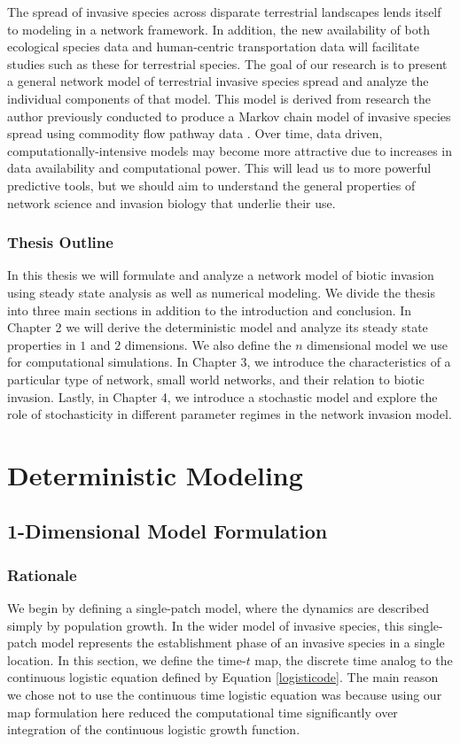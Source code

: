 \documentclass[12pt, openany]{book}
\theoremstyle{definition}
\theoremstyle{remark}
\numberwithin{equation}{chapter}
\numberwithin{figure}{chapter}
\begin{document}
The spread of invasive species across disparate terrestrial landscapes lends itself to modeling in a network framework. In addition, the new availability of both ecological species data and human-centric transportation data will facilitate studies such as these for terrestrial species. The goal of our research is to present a general network model of terrestrial invasive species spread and analyze the individual components of that model. This model is derived from research the author previously conducted to produce a Markov chain model of invasive species spread using commodity flow pathway data \citep{yan2015transport}. Over time, data driven, computationally-intensive models may become more attractive due to increases in data availability and computational power. This will lead us to more powerful predictive tools, but we should aim to understand the general properties of network science and invasion biology that underlie their use.

\subsection{Thesis Outline}

In this thesis we will formulate and analyze a network model of biotic invasion using steady state analysis as well as numerical modeling. We divide the thesis into three main sections in addition to the introduction and conclusion. In Chapter 2 we will derive the deterministic model and analyze its steady state properties in $1$ and $2$ dimensions. We also define the $n$ dimensional model we use for computational simulations. In Chapter 3, we introduce the characteristics of a particular type of network, small world networks, and their relation to biotic invasion. Lastly, in Chapter 4, we introduce a stochastic model and explore the role of stochasticity in different parameter regimes in the network invasion model.

\chapter{Deterministic Modeling}
\section{1-Dimensional Model Formulation}

\subsection{Rationale}
We begin by defining a single-patch model, where the dynamics are described simply by population growth. In the wider model of invasive species, this single-patch model represents the establishment phase of an invasive species in a single location. In this section, we define the time-$t$ map, the discrete time analog to the continuous logistic equation defined by Equation \ref{logisticode}. The main reason we chose not to use the continuous time logistic equation was because using our map formulation here reduced the computational time significantly over integration of the continuous logistic growth function.
\end{document}
